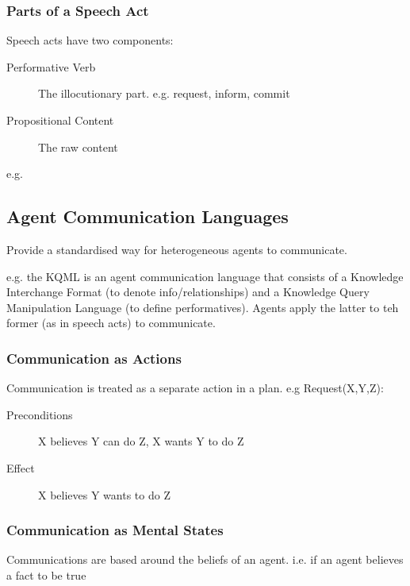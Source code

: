 \subsubsection{Parts of a Speech Act}
Speech acts have two components:
\begin{description}
    \item [Performative Verb] The illocutionary part. e.g. request, inform, commit
    \item [Propositional Content] The raw content
\end{description}
e.g.
\begin{table}[H]
\centering
{}
\end{table}

\subsection{Agent Communication Languages}
Provide a standardised way for heterogeneous agents to communicate. 

e.g. the KQML is an agent communication language that consists of a Knowledge Interchange Format (to denote info/relationships) and a Knowledge Query Manipulation Language (to define performatives). Agents apply the latter to teh former (as in speech acts) to communicate. 

\subsubsection{Communication as Actions}
Communication is treated as a separate action in a plan. e.g Request(X,Y,Z):
\begin{description}
    \item [Preconditions] X believes Y can do Z, X wants Y to do Z
    \item [Effect] X believes Y wants to do Z
\end{description}


\subsubsection{Communication as Mental States}
Communications are based around the beliefs of an agent. i.e. if an agent believes a fact to be true

